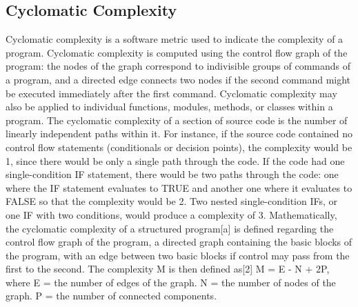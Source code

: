 \subsection{Cyclomatic Complexity}
Cyclomatic complexity is a software metric used to indicate the complexity of a program. Cyclomatic complexity is computed using the control flow graph of the program: the nodes of the graph correspond to indivisible groups of commands of a program, and a directed edge connects two nodes if the second command might be executed immediately after the first command. Cyclomatic complexity may also be applied to individual functions, modules, methods, or classes within a program. The cyclomatic complexity of a section of source code is the number of linearly independent paths within it. For instance, if the source code contained no control flow statements (conditionals or decision points), the complexity would be 1, since there would be only a single path through the code. If the code had one single-condition IF statement, there would be two paths through the code: one where the IF statement evaluates to TRUE and another one where it evaluates to FALSE so that the complexity would be 2. Two nested single-condition IFs, or one IF with two conditions, would produce a complexity of 3.
Mathematically, the cyclomatic complexity of a structured program[a] is defined regarding the control flow graph of the program, a directed graph containing the basic blocks of the program, with an edge between two basic blocks if control may pass from the first to the second. The complexity M is then defined as[2]
M = E - N + 2P,
where
E = the number of edges of the graph.
N = the number of nodes of the graph.
P = the number of connected components.


